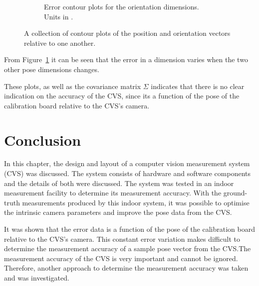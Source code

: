 \begin{figure}
\begin{subfigure}{0.48\textwidth}
\begin{subfigure}{\textwidth}
    \end{subfigure}
    \caption{Error contour plots for the orientation dimensions. Units in \textdegree.}
  \end{subfigure}
  \caption[A collection of contour plots of the position and orientation vectors relative to one another]{A collection of contour plots of the position and orientation vectors relative to one another.}
  \label{fig:err-contour}
\end{figure}

From Figure~\ref{fig:err-contour} it can be seen that the error in a dimension varies when the two other pose dimensions changes. 

These plots, as well as the covariance matrix $\Sigma$ indicates that there is no clear indication on the accuracy of the CVS, since its a function of the pose of the calibration board relative to the CVS's camera. 

\section{Conclusion}

In this chapter, the design and layout of a computer vision measurement system (CVS) was discussed. The system consists of hardware and software components and the details of both were discussed. The system was tested in an indoor measurement facility to determine its measurement accuracy. With the ground-truth measurements produced by this indoor system, it was possible to optimise the intrinsic camera parameters and improve the pose data from the CVS.

It was shown that the error data is a function of the pose of the calibration board relative to the CVS's camera. This constant error variation makes difficult to determine the measurement accuracy of a sample pose vector from the CVS.\@ The measurement accuracy of the CVS is very important and cannot be ignored. Therefore, another approach to determine the measurement accuracy was taken and was investigated. 
